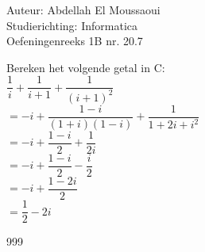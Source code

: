 \documentclass[a4paper]{article}
\begin{document}
  
\noindent \large Auteur: Abdellah El Moussaoui \\
\noindent \large Studierichting: Informatica\\
\noindent \large Oefeningenreeks 1B nr. 20.7\\

\medskip

\normalsize

\medskip

Bereken het volgende getal in C: \\

$\dfrac{1}{i}+\dfrac{1}{i+1}+\dfrac{1}{(i+1)^2}$\\

$=-i+\dfrac{1-i}{(1+i)(1-i)}+\dfrac{1}{1+2i+i^2}$\\

$=-i+\dfrac{1-i}{2}+\dfrac{1}{2i}$\\

$=-i+\dfrac{1-i}{2}-\dfrac{i}{2}$\\

$=-i+\dfrac{1-2i}{2}$\\

$=\dfrac{1}{2}-2i$\\

\begin{thebibliography}{999}
\end{thebibliography}
\end{document}
